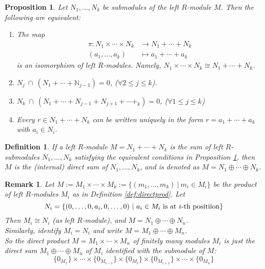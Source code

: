 \documentclass[a4paper,8pt]{article}
\newcommand{\N}{\mathbb{N}}
\newcommand{\hlt}[1]{\textit{{\color{blue}#1}}}
\theoremstyle{theorem}
\newtheorem{proposition}[theorem]{Proposition}
\newtheorem{definition}[theorem]{Definition}
\newtheorem{remark}[theorem]{Remark}
\begin{document}
\begin{proposition}
\label{prop:submoduleequiv}
Let $N_1, \ldots, N_k$ be submodules of the left $R$-module $M$. Then the following are equivalent:
\begin{enumerate}[label=(\roman*)]
\item The map
\begin{align}
\pi : N_1 \times \cdots \times N_k &\rightarrow N_1 + \cdots + N_k \nonumber \\
(a_1, \ldots, a_k) &\mapsto a_1 + \cdots + a_k \nonumber
\end{align}
is an isomorphism of left $R$-modules. Namely, $N_1 \times \cdots \times N_k \cong N_1 + \cdots + N_k$.
\item $N_j \ \cap \ (N_1 + \cdots + \N_{j-1}) = 0$, ($\forall 2 \leq j \leq k$).
\item $N_k \ \cap \ (N_1 + \cdots + N_{j-1} + N_{j+1} + \cdots + _k) = 0$, ($\forall 1 \leq j \leq k$)
\item Every $r \in N_1 + \cdots + N_k$ can be written uniquely in the form $r = a_1 + \cdots + a_k$ with $a_i \in N_i$.
\end{enumerate}
\end{proposition}

\begin{definition}
If a left $R$-module $M=N_1 + \cdots + N_k$ is the sum of left $R$-submodules $N_1, \ldots, N_k$ satisfying the equivalent conditions in Proposition \ref{prop:submoduleequiv}, then $M$ is the \hlt{(internal) direct sum} of $N_1, \ldots, N_k$, and is denoted as $M = N_1 \oplus \cdots \oplus N_k$.
\end{definition}

\begin{remark}
Let $M := M_1 \times \cdots \times M_k := \{(m_1, \ldots, m_k) \ | \ m_i \in M_i\}$ be the product of left $R$-modules $M_i$ as in Definition \ref{def:directprod}. Let
\begin{equation}
N_i = \{(0, \ldots, 0, a_i, 0, \ldots, 0) \ | \ a_i \in M_i \textnormal{ is at $i$-th positiion}\} \nonumber
\end{equation}
Then $M_i \cong N_i$ (as left $R$-module), and $M = N_1 \oplus \cdots \oplus N_n$.\\
Similarly, identify $M_i = N_i$ and write $M = M_1 \oplus \cdots \oplus M_n$.\\
So the direct product $M=M_1 \times \cdots \times M_n$ of finitely many modules $M_i$ is just the direct sum $M_1 \oplus \cdots \oplus M_n$ of $M_i$ identified with the submodule of $M$:
\begin{equation}
\{0_{M_1}\} \times \cdots \times \{0_{M_{i-1}}\} \times \{0_{M_i}\} \times \{0_{M_{i+1}}\} \times \cdots \times \{0_{M_n}\} \nonumber
\end{equation}
\end{remark}
\end{document}
